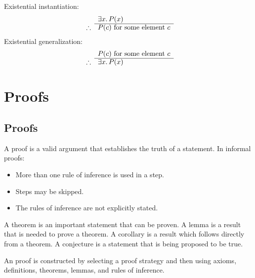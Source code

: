 Existential instantiation:
\begin{equation}
    \begin{array}{r l}
                   & \exists x\ldotp P(x)             \\
        \cline{2-2}
        \therefore & P(c) \text{ for some element } c
    \end{array}
\end{equation}
Existential generalization:
\begin{equation}
    \begin{array}{r l}
                   & P(c) \text{ for some element } c \\
        \cline{2-2}
        \therefore & \exists x\ldotp P(x)
    \end{array}
\end{equation}

\section{Proofs}
\subsection{Proofs}
A proof is a valid argument that establishes the truth of a statement. In informal proofs:
\begin{itemize}
    \item More than one rule of inference is used in a step.
    \item Steps may be skipped.
    \item The rules of inference are not explicitly stated.
\end{itemize}
A theorem is an important statement that can be proven. A lemma is a result that is needed to prove a theorem. A corollary is a result which follows directly from a theorem. A conjecture is a statement that is being proposed to be true.

An proof is constructed by selecting a proof strategy and then using axioms, definitions, theorems, lemmas, and rules of inference.

